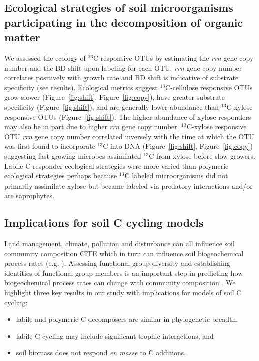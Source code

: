 \subsection{Ecological strategies of soil microorganisms participating in the
decomposition of organic matter}
We assessed the ecology of $^{13}$C-responsive OTUs by estimating the
\textit{rrn} gene copy number and the BD shift upon labeling for each OTU.
\textit{rrn} gene copy number correlates positively with growth rate
\citep{11125085} and BD shift is indicative of substrate specificity (see
results). Ecological metrics suggest $^{13}$C-cellulose responsive OTUs grow
slower (Figure~\ref{fig:shift}, Figure~\ref{fig:copy}), have greater substrate
specificity (Figure~\ref{fig:shift}), and are generally lower abundance than
$^{13}$C-xylose responsive OTUs (Figure~\ref{fig:shift}). The higher abundance
of xylose responders may also be in part due to higher \textit{rrn} gene copy
number. $^{13}$C-xylose responsive OTU \textit{rrn} gene copy number correlated
inversely with the time at which the OTU was first found to incorporate
$^{13}$C into DNA (Figure~\ref{fig:shift}, Figure~\ref{fig:copy}) suggesting
fast-growing microbes assimilated $^{13}$C from xylose before slow growers.
Labile C responder ecological strategies were more varied than polymeric
ecological strategies perhaps because $^{13}$C labeled microorganisms did not
primarily assimilate xylose but became labeled via predatory interactions
and/or are saprophytes. 

\subsection{Implications for soil C cycling models}
Land management, climate, pollution and disturbance can all influence soil
community composition CITE which in turn can influence soil biogeochemical
process rates (e.g. \citep{Berlemont2014a}). Assessing functional group
diversity and establishing identities of functional group members is an
important step in predicting how biogeochemical process rates can change with
community composition \citep{Schimel_1995,McGuire2010}. We highlight three key
results in our study with implications for models of soil C cycling:
\begin{itemize} \item labile and polymeric C decomposers are similar in
phylogenetic breadth, \item labile C cycling may include significant trophic
interactions, and \item soil biomass does not respond \textit{en masse} to
C additions.\end{itemize}

